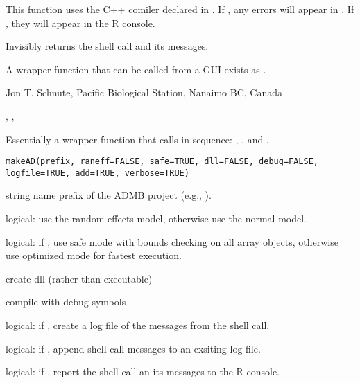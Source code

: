 \documentclass[letterpaper]{book}
\begin{document}
%
\begin{Details}\relax
This function uses the C++ comiler declared in . If ,
any errors will appear in . If ,
they will appear in the R console.
\end{Details}
%
\begin{Value}
Invisibly returns the shell call and its messages.
\end{Value}
%
\begin{Note}\relax
A wrapper function that can be called from a GUI exists as .
\end{Note}
%
\begin{Author}\relax
 Jon T. Schnute, Pacific Biological Station, Nanaimo BC, Canada 
\end{Author}
%
\begin{SeeAlso}\relax
 , ,  
\end{SeeAlso}
%
\begin{Description}\relax
Essentially a wrapper function that calls in sequence: ,
, and .
\end{Description}
%
\begin{Usage}
\begin{verbatim}
makeAD(prefix, raneff=FALSE, safe=TRUE, dll=FALSE, debug=FALSE, logfile=TRUE, add=TRUE, verbose=TRUE)
\end{verbatim}
\end{Usage}
%
\begin{Arguments}
\begin{ldescription}
\item[\code{prefix}] string name prefix of the ADMB project (e.g., ).
\item[\code{raneff}] logical: use the random effects model, otherwise use the normal model.
\item[\code{safe}] logical: if , use safe mode with bounds checking on all
array objects, otherwise use optimized mode for fastest execution.
\item[\code{dll}] create dll (rather than executable)
\item[\code{debug}] compile with debug symbols
\item[\code{logfile}] logical: if , create a log file of the messages from the shell call.
\item[\code{add}] logical: if , append shell call messages to an exsiting log file.
\item[\code{verbose}] logical: if , report the shell call an its messages to the R console.
\end{ldescription}
\end{Arguments}
\end{document}
